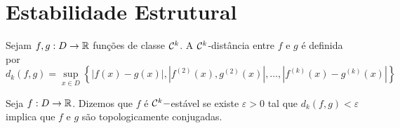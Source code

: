 \section{Estabilidade Estrutural}

\begin{definition}
Sejam $f, g: D \to \mathbb{R}$ funções de classe $\mathcal{C}^k$. A $\mathcal{C}^k$-distância entre $f$ e $g$ é definida por
$$d_k(f, g) = \sup_{x \in D} \left \{ |f(x) - g(x)|, |f^{(2)}(x), g^{(2)}(x)|, \dots, |f^{(k)}(x) - g^{(k)}(x)| \right \}$$
\end{definition}

\begin{definition}
Seja $f: D \to \mathbb{R}$. Dizemos que $f$ é $\mathcal{C}^k-$estável se existe $\varepsilon > 0$ tal que $d_k(f, g) < \varepsilon$ implica que $f$ e $g$ são topologicamente conjugadas.
\end{definition}

